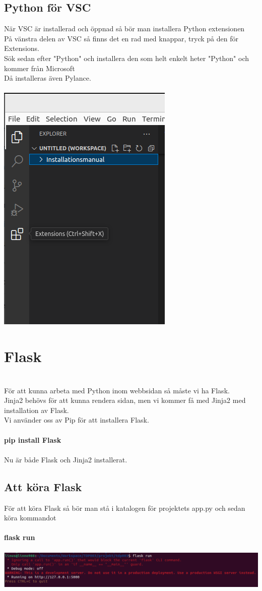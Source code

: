 \documentclass{TDP003mall}
\begin{document}
\subsection{Python för VSC}
När VSC är installerad och öppnad så bör man installera Python extensionen\\
På vänstra delen av VSC så finns det en rad med knappar, tryck på den för Extensions.\\
Sök sedan efter "Python" och installera den som helt enkelt heter "Python" och kommer från Microsoft\\
Då installeras även Pylance.\\\\
\includegraphics[scale=0.5]{extensions}


\section{Flask}\\
För att kunna arbeta med Python inom webbsidan så måste vi ha Flask.\\
Jinja2 behövs för att kunna rendera sidan, men vi kommer få med Jinja2 med installation av Flask.\\ 
Vi använder oss av Pip för att installera Flask.\\\\
\textbf{pip install Flask}\\\\
Nu är både Flask och Jinja2 installerat.\\
\subsection{Att köra Flask}
För att köra Flask så bör man stå i katalogen för projektets app.py och sedan köra kommandot\\\\
\textbf{flask run}\\\\
\includegraphics[scale=0.4]{flask_run}
\end{document}
